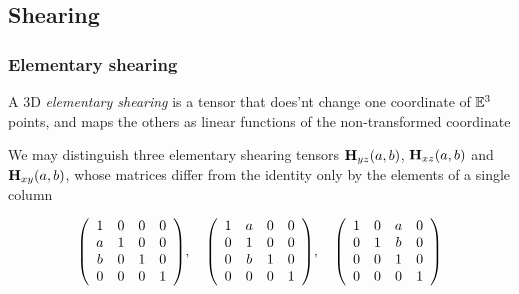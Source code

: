 \documentclass{beamer}
\begin{document}
\subsection{Shearing}
\begin{frame}\frametitle{Elementary shearing}\small

A 3D \emph{elementary shearing}  is a tensor that does'nt change one coordinate of $\mathbb{E}^3$ points, and maps the others as linear functions of the non-transformed coordinate 

\vfill

We may distinguish three elementary shearing tensors ${\bf H}_{yz}(a,b)$, ${\bf H}_{xz}(a,b)$ and
${\bf H}_{xy}(a,b)$, whose matrices differ from the identity only by the elements of a single column

\vfill
\[
{\left(\begin{array}{cccccccccccccccccccccccccccc}
1 & 0 & 0 & 0\\
a & 1 & 0 & 0\\
b & 0 & 1 & 0\\
0 & 0 & 0 & 1
\end{array}\right)}, \quad
{\left(\begin{array}{cccccccccccccccccccccccccccc}
1 & a & 0 & 0\\
0 & 1 & 0 & 0\\
0 & b & 1 & 0\\
0 & 0 & 0 & 1
\end{array}\right)}, \quad
{\left(\begin{array}{cccccccccccccccccccccccccccc}
1 & 0 & a & 0\\
0 & 1 & b & 0\\
0 & 0 & 1 & 0\\
0 & 0 & 0 & 1
\end{array}\right)}
\]

\end{frame}
\end{document}
